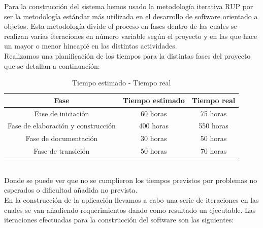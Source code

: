 \documentclass[a4paper,12pt]{article}
\begin{document}
\noindent Para la construcción del sistema hemos usado la metodología iterativa RUP por ser la metodología estándar más utilizada en el desarrollo  de software orientado a objetos. Esta metodología divide el proceso en fases dentro de las cuales se realizan varias iteraciones en número variable según el proyecto y en las que hace un mayor o menor hincapié en las distintas actividades.
\\Realizamos una planificación de los tiempos para la distintas fases del proyecto que se detallan a continuación:
\begin{table}[ht]
\centering  %
\begin{tabular}{c c c} %
\hline\hline                        %
Fase & Tiempo estimado & Tiempo real \\ [0.5ex] %
\hline                  %
Fase de iniciación & 60 horas & 75 horas  \\ %
Fase de elaboración y construcción & 400 horas & 550 horas \\
Fase de documentación & 30 horas &  50 horas\\
Fase de transición & 50 horas & 70 horas  \\ [1ex]      %
\hline %
\end{tabular}
\caption{Tiempo estimado - Tiempo real} %
\end{table}\\
Donde se puede ver que no se cumplieron los tiempos previstos por problemas no esperados o dificultad añadida no prevista.\\
En la construcción de la aplicación llevamos a cabo una serie de iteraciones en las cuales se van añadiendo requerimientos dando como resultado un ejecutable. Las iteraciones efectuadas para la construcción del software son las siguientes:
\end{document}
